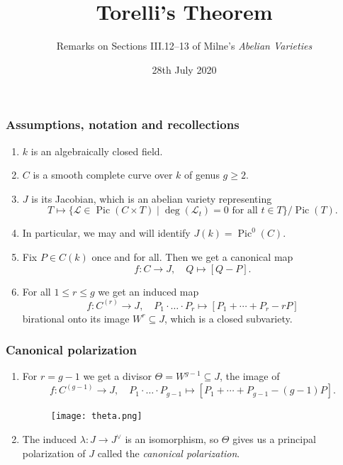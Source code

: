 \documentclass[notheorems, hyperref]{beamer}
\title[Torelli's Theorem]{Torelli's Theorem}
\author{Remarks on Sections III.12--13 of Milne's \textit{Abelian Varieties}}
\institute{University of Freiburg}
\date{28th July 2020}
\theoremstyle{darkgreentheorem}
\theoremstyle{darkbluedefinition}
\theoremstyle{darkredexample}
\theoremstyle{remark}
\DeclareMathOperator{\Pic}{Pic}
\renewcommand{\L}{\mathcal{L}}
\newcommand{\dual}{^{\vee}}
\begin{document}
 
\frame{\titlepage}

\begin{frame}
    \frametitle{Assumptions, notation and recollections}
    \begin{enumerate}[label=\textbullet]
	\item $k$ is an algebraically closed field.
	    \pause
	\item $C$ is a smooth complete curve over $k$ of genus $g\geqslant 2$.
	    \pause
	\item $J$ is its Jacobian, which is an abelian variety representing
	    \[ T \mapsto \{ \L\in \Pic(C\times T) \mid \deg(\L_{t})=0 \text{ for all }t\in T \}/\Pic(T). \]
	    \vspace{-1em}
	    \pause
	\item In particular, we may and will identify $J(k)=\Pic^{0}(C)$.
	    \pause
	\item Fix $P\in C(k)$ once and for all.
	    Then we get a canonical map
	    \[ f\colon C\to J, \quad Q\mapsto [Q-P]. \]
	    \vspace{-1em}
	    \pause
	\item For all $1\leqslant r\leqslant g$ we get an induced map
	    \[ f\colon C^{(r)} \to J, \quad P_{1}\cdot \ldots \cdot P_{r}\mapsto [P_{1}+\cdots +P_{r}-rP] \]
	    birational onto its image $W^{r}\subseteq J$, which is a closed subvariety.
    \end{enumerate}
\end{frame}

\begin{frame}
    \frametitle{Canonical polarization}
    \begin{enumerate}[label=\textbullet]
	\item For $r=g-1$ we get a divisor $\Theta=W^{g-1}\subseteq J$, the image of
	    \[ f\colon C^{(g-1)}\to J, \quad P_{1}\cdot \ldots \cdot P_{g-1} \mapsto [P_{1}+\cdots +P_{g-1}-(g-1)P ]. \]
	    \vspace{-1em}
	    \pause
	    \begin{figure}[htp]
		\centering
		\texttt{[image: theta.png]}
	    \end{figure}
	    \pause
	\item The induced $\lambda \colon J\to J\dual$ is an isomorphism, so $\Theta$ gives us a principal polarization of $J$ called the \textit{canonical polarization}.
    \end{enumerate}
\end{frame}
\end{document}

